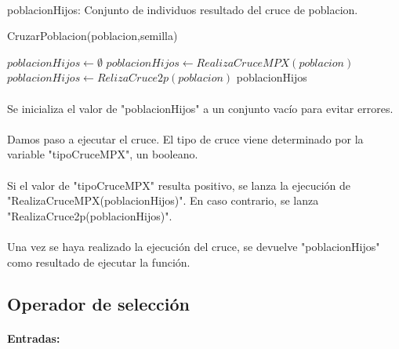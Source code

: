 	\paragraph{}poblacionHijos: Conjunto de individuos resultado del cruce de poblacion.

	\begin{algorithm}[H]
		\caption{CruzarPoblacion(poblacion,semilla)}
		\begin{algorithmic}
			\STATE $poblacionHijos \leftarrow \emptyset$
			\STATE $poblacionHijos \leftarrow RealizaCruceMPX(poblacion)$
			\ELSE
			\STATE $poblacionHijos \leftarrow RelizaCruce2p(poblacion)$
			\ENDIF
			\RETURN poblacionHijos
		\end{algorithmic}
	\end{algorithm}

	\paragraph{}Se inicializa el valor de "poblacionHijos" a un conjunto vacío para evitar errores.
	
	\paragraph{}Damos paso a ejecutar el cruce. El tipo de cruce viene determinado por la variable "tipoCruceMPX", un booleano.
	
	\paragraph{}Si el valor de "tipoCruceMPX" resulta positivo, se lanza la ejecución de "RealizaCruceMPX(poblacionHijos)". En caso contrario, se lanza "RealizaCruce2p(poblacionHijos)".
	
	\paragraph{} Una vez se haya realizado la ejecución del cruce, se devuelve "poblacionHijos" como resultado de ejecutar la función.
	
	\subsection{Operador de selección}
	
	\paragraph{Entradas:}
	
